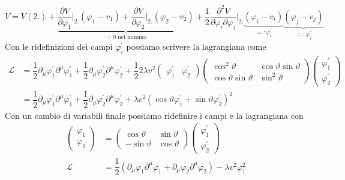 \documentclass[italian,a4paper]{article}
\theoremstyle{definition}
\newcommand{\lagr}{\ensuremath{\mathscr{L}}}
\renewcommand{\theta}{\vartheta}
\begin{document}
\begin{equation*}
    V = V(2.)
    + \underbrace{\dfrac{\partial V}{\partial \varphi_1}\rvert_{2.}(\varphi_1 - v_1)
    + \dfrac{\partial V}{\partial \varphi_2}\rvert_{2.}(\varphi_2 -
    v_2)}_{= 0\text{ nel minimo}}
    + \dfrac{1}{2}\dfrac{\partial^2 V}{\partial \varphi_i\partial \varphi_j}|_{2.}
    \underbrace{(\varphi_i - v_i)}_{=\mathop:\varphi_i^\prime}\underbrace{(\varphi_j -
    v_j)}_{=\mathop:\varphi_j^\prime}
\end{equation*}
Con le ridefinizioni dei campi $\varphi_i^\prime$ possiamo scrivere la lagrangiana
come
\begin{align*}
    \lagr &= 
    \dfrac{1}{2}\partial_\mu \varphi_1^\prime\partial^\mu \varphi_1^\prime +
    \dfrac{1}{2}\partial_\mu \varphi_2^\prime\partial^\mu \varphi_2^\prime +
    \dfrac{1}{2}2\lambda v^2
    \begin{pmatrix}
        \varphi_1^\prime & \varphi_2^\prime
    \end{pmatrix}
    \begin{pmatrix}
        \cos^2 \theta & \cos\theta \sin\theta\\
        \cos\theta \sin\theta & \sin^2 \theta
    \end{pmatrix}
    \begin{pmatrix}
        \varphi_1^\prime\\
        \varphi_2^\prime
    \end{pmatrix}\\
    &= 
    \dfrac{1}{2}\partial_\mu \varphi_1^\prime\partial^\mu \varphi_1^\prime +
    \dfrac{1}{2}\partial_\mu \varphi_2^\prime\partial^\mu \varphi_2^\prime +
    \lambda v^2(\cos\theta \varphi_1^\prime + \sin\theta \varphi_2^\prime)^2
\end{align*}
Con un cambio di variabili finale possiamo ridefinire i campi e la
lagrangiana con
\begin{align*}
    \begin{pmatrix}
        \varphi_1\\
        \varphi_2
    \end{pmatrix} &= 
    \begin{pmatrix}
        \cos \theta & \sin \theta \\
        -\sin \theta & \cos \theta
    \end{pmatrix}
     \begin{pmatrix}
        \varphi_1^\prime\\
        \varphi_2^\prime
    \end{pmatrix}\\
\lagr &=
    \dfrac{1}{2}(\partial_\mu \varphi_1\partial^\mu \varphi_1 +
    \partial_\mu \varphi_2\partial^\mu \varphi_2) -
    \lambda v^2 \varphi_1^2
\end{align*}
\end{document}
